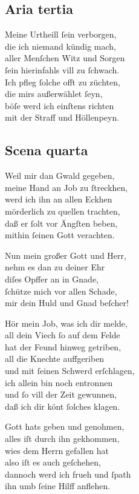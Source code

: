 \documentclass{ees}
\newenvironment{lyrics}[1]{%
  \subsection{#1}\nopagebreak%
  \begin{lyricslist}%
  \let\voice\item%
}{%
  \end{lyricslist}%
}
\begin{document}
\begin{lyrics}{Aria tertia}
  \voice[Schöpffer]
  Meine Urtheill ſein verborgen,\\
  die ich niemand kündig mach,\\
  aller Menſchen Witz und Sorgen\\
  ſein hierinfahls vill zu ſchwach.\\[1ex]
  Ich pfleg ſolche offt zu züchten,\\
  die mirs außerwählet ſeyn,\\
  böſe werd ich einſtens richten\\
  mit der Straff und Höllenpeyn.
\end{lyrics}
\clearpage
\begin{lyrics}{Scena quarta}
  \voice[Leviathan]
  Weil mir dan Gwald gegeben,\\
  meine Hand an Job zu ſtreckhen,\\
  werd ich ihn an allen Eckhen\\
  mörderlich zu quellen trachten,\\
  daß er ſolt vor Ängſten beben,\\
  mithin ſeinen Gott verachten.

  \voice[Job]
  Nun mein großer Gott und Herr,\\
  nehm es dan zu deiner Ehr\\
  diſes Opffer an in Gnade,\\
  ſchütze mich vor allen Schade,\\
  mir dein Huld und Gnad beſcher!

  \voice[Leviathan]
  Hör mein Job, was ich dir melde,\\
  all dein Viech ſo auf dem Felde\\
  hat der Feund hinweg getriben,\\
  all die Knechte auffgeriben\\
  und mit ſeinen Schwerd erſchlagen,\\
  ich allein bin noch entronnen\\
  und ſo vill der Zeit gewunnen,\\
  daß ich dir könt ſolches klagen.

  \voice[Job]
  Gott hats geben und genohmen,\\
  alles iſt durch ihn gekhommen,\\
  wies dem Herrn gefallen hat\\
  also iſt es auch geſchehen,\\
  dannoch werd ich frueh und ſpath\\
  ihn umb ſeine Hilff anflehen.


\end{lyrics}
\end{document}
